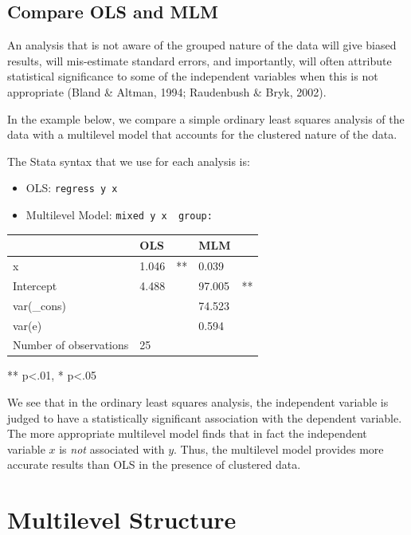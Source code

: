 \documentclass[
  letterpaper,
  DIV=11,
  numbers=noendperiod]{scrreprt}
\providecommand{\tightlist}{%
  \setlength{\itemsep}{0pt}\setlength{\parskip}{0pt}}\usepackage{longtable,booktabs,array}
\begin{document}
\hypertarget{compare-ols-and-mlm}{%
\subsection{Compare OLS and MLM}\label{compare-ols-and-mlm}}

An analysis that is not aware of the grouped nature of the data will
give biased results, will mis-estimate standard errors, and importantly,
will often attribute statistical significance to some of the independent
variables when this is not appropriate (Bland \& Altman, 1994;
Raudenbush \& Bryk, 2002).

In the example below, we compare a simple ordinary least squares
analysis of the data with a multilevel model that accounts for the
clustered nature of the data.

The Stata syntax that we use for each analysis is:

\begin{itemize}
\tightlist
\item
  OLS: \texttt{regress\ y\ x}
\item
  Multilevel Model: \texttt{mixed\ y\ x\ \textbar{}\textbar{}\ group:}
\end{itemize}

\begin{longtable}[]{@{}lllll@{}}
\toprule\noalign{}
& OLS & & MLM & \\
\midrule\noalign{}
\endhead
\bottomrule\noalign{}
\endlastfoot
x & 1.046 & ** & 0.039 & \\
Intercept & 4.488 & & 97.005 & ** \\
var(\_cons) & & & 74.523 & \\
var(e) & & & 0.594 & \\
Number of observations & 25 & & & \\
\end{longtable}

** p\textless.01, * p\textless.05

We see that in the ordinary least squares analysis, the independent
variable is judged to have a statistically significant association with
the dependent variable. The more appropriate multilevel model finds that
in fact the independent variable \(x\) is \emph{not} associated with
\(y\). Thus, the multilevel model provides more accurate results than
OLS in the presence of clustered data.

\hypertarget{sec-multilevelstructure}{%
\section{Multilevel Structure}\label{sec-multilevelstructure}}
\end{document}

